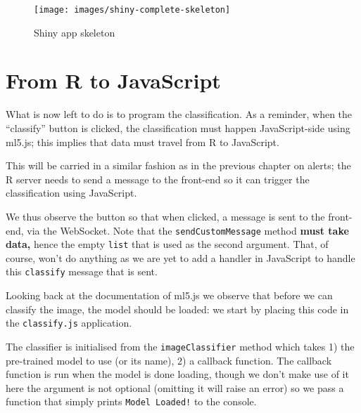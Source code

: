 \documentclass[
  10pt,
]{krantz}
\makeatletter
\newenvironment{Shaded}{\begin{snugshade}}{\end{snugshade}}
\newcommand{\KeywordTok}[1]{\textcolor[rgb]{0.27,0.27,0.27}{\textbf{#1}}}
\newcommand{\NormalTok}[1]{#1}
\newcommand{\OperatorTok}[1]{\textcolor[rgb]{0.43,0.43,0.43}{\textbf{#1}}}
\newcommand{\StringTok}[1]{\textcolor[rgb]{0.5,0.5,0.5}{#1}}
\newenvironment{kframe}{%
\medskip{}
\setlength{\fboxsep}{.8em}
 \def\at@end@of@kframe{}%
 \ifinner\ifhmode%
  \def\at@end@of@kframe{\end{minipage}}%
  \begin{minipage}{\columnwidth}%
 \fi\fi%
 \def\FrameCommand##1{\hskip\@totalleftmargin \hskip-\fboxsep
 \colorbox{shadecolor}{##1}\hskip-\fboxsep
     \hskip-\linewidth \hskip-\@totalleftmargin \hskip\columnwidth}%
 \MakeFramed {\advance\hsize-\width
   \@totalleftmargin\z@ \linewidth\hsize
   \@setminipage}}%
 {\par\unskip\endMakeFramed%
 \at@end@of@kframe}
\renewenvironment{Shaded}{\begin{kframe}}{\end{kframe}}
\makeatother
\begin{document}
\begin{figure}[H]

{\centering \texttt{[image: images/shiny-complete-skeleton]} 

}

\caption{Shiny app skeleton}\label{fig:shiny-complete-skeleton}
\end{figure}

\hypertarget{shiny-complete-r2js}{%
\section{From R to JavaScript}\label{shiny-complete-r2js}}

What is now left to do is to program the classification. As a reminder, when the ``classify'' button is clicked, the classification must happen JavaScript-side using ml5.js; this implies that data must travel from R to JavaScript.

This will be carried in a similar fashion as in the previous chapter on alerts; the R server needs to send a message to the front-end so it can trigger the classification using JavaScript.

\begin{Shaded}
\end{Shaded}

We thus observe the button so that when clicked, a message is sent to the front-end, via the WebSocket. Note that the \texttt{sendCustomMessage} method \textbf{must take data,} hence the empty \texttt{list} that is used as the second argument. That, of course, won't do anything as we are yet to add a handler in JavaScript to handle this \texttt{classify} message that is sent.

Looking back at the documentation of ml5.js we observe that before we can classify the image, the model should be loaded: we start by placing this code in the \texttt{classify.js} application.

The classifier is initialised from the \texttt{imageClassifier} method which takes 1) the pre-trained model to use (or its name), 2) a callback function. The callback function is run when the model is done loading, though we don't make use of it here the argument is not optional (omitting it will raise an error) so we pass a function that simply prints \texttt{Model\ Loaded!} to the console.
\end{document}
